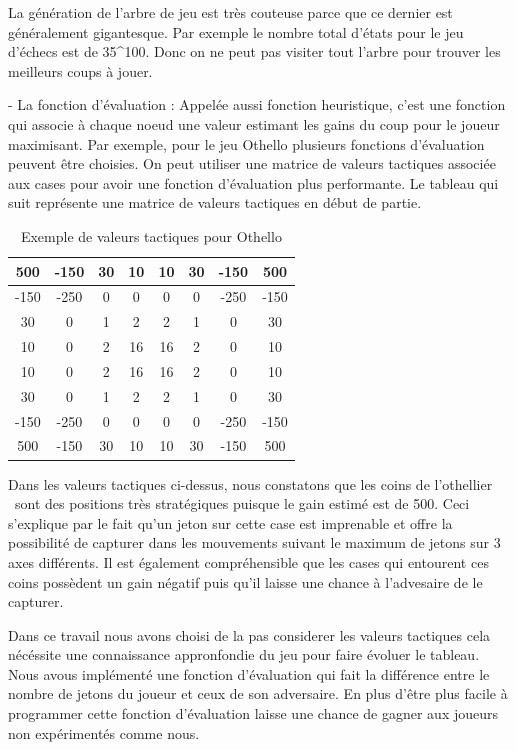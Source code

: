 \documentclass[11pt]{article}
\begin{document}
La génération de l'arbre de jeu est très couteuse parce que ce
dernier est généralement gigantesque. Par exemple le nombre total
d'états pour le jeu d'échecs est de 35\^{}100. Donc on ne peut pas
visiter tout l'arbre pour trouver les meilleurs coups à jouer.

- La fonction d'évaluation : Appelée aussi fonction heuristique, c'est
une fonction qui associe à chaque noeud une valeur estimant les gains du
coup pour le joueur maximisant. Par exemple, pour le jeu Othello plusieurs
fonctions d'évaluation peuvent être choisies. On peut utiliser une
matrice de valeurs tactiques associée aux cases pour avoir une fonction
d'évaluation plus performante. Le tableau qui suit représente une
matrice de valeurs tactiques en début de partie.

\begin{table}[h]
  \begin{tabular}{|c|c|c|c|c|c|c|c|}
    \hline
    500  & -150  &  30  &  10  &  10  &  30  & -150  &  500 \\
    \hline
    -150  &  -250  & 0 & 0 & 0 & 0 & -250 & -150\\
    \hline
    30 & 0 & 1 & 2 & 2 & 1 & 0 & 30\\
    \hline
    10 & 0 & 2 & 16 & 16 & 2 & 0 & 10\\
    \hline
    10 & 0 & 2 & 16 & 16 & 2 & 0 & 10\\
    \hline
    30 & 0 & 1 & 2 & 2 & 1 & 0 & 30\\
    \hline
    -150 & -250 & 0 & 0 & 0 & 0 & -250 & -150\\
    \hline
    500 & -150 & 30 & 10 & 10 & 30 & -150 & 500\\
    \hline
  \end{tabular}
  \caption{Exemple de valeurs tactiques pour Othello}
\end{table}

Dans les valeurs tactiques ci-dessus, nous constatons que les coins de
l'othellier \ sont des positions très stratégiques puisque le gain
estimé est de 500. Ceci s'explique par le fait qu'un jeton sur cette case
est imprenable et offre la possibilité de capturer dans les mouvements
suivant le maximum de jetons sur 3 axes différents. Il est également
compréhensible que les cases qui entourent ces coins possèdent un gain
négatif puis qu'il laisse une chance à l'advesaire de le capturer.

Dans ce travail nous avons choisi de la pas considerer les valeurs tactiques
cela nécéssite une connaissance appronfondie du jeu pour faire
évoluer le tableau. Nous avous implémenté une fonction
d'évaluation qui fait la différence entre le nombre de jetons du
joueur et ceux de son adversaire. En plus d'être plus facile à
programmer cette fonction d'évaluation laisse une chance de gagner aux
joueurs non expérimentés comme nous.
\end{document}
